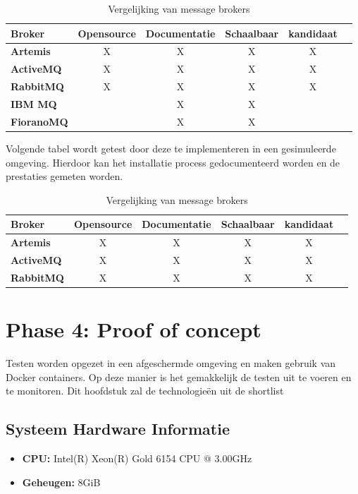 \begin{table}[h!]
  \centering
  \footnotesize
\begin{tabular}{|l|c|c|c|c|c|}
  \hline
  \textbf{Broker} & \textbf{Opensource} & \textbf{Documentatie} & \textbf{Schaalbaar} & \textbf{kandidaat}\\ \hline
  \textbf{Artemis}   & X & X & X & X \\ \hline
  \textbf{ActiveMQ}  & X & X & X & X \\ \hline
  \textbf{RabbitMQ}  & X & X & X & X \\ \hline  
  \textbf{IBM MQ}    &   & X & X &  \\ \hline 
  \textbf{FioranoMQ} &   & X & X &  \\ \hline 
\end{tabular}
\caption{Vergelijking van message brokers}
\label{tab:vergelijking_message_brokers_should_have}
\end{table}

Volgende tabel wordt getest door deze te implementeren in een gesimuleerde omgeving.
Hierdoor kan het installatie process gedocumenteerd worden en de prestaties gemeten worden.  

\begin{table}[h!]
  \centering
  \footnotesize
\begin{tabular}{|l|c|c|c|c|c|}
  \hline
  \textbf{Broker} & \textbf{Opensource} & \textbf{Documentatie} & \textbf{Schaalbaar} & \textbf{kandidaat}\\ \hline
  \textbf{Artemis}   & X & X & X & X \\ \hline
  \textbf{ActiveMQ}  & X & X & X & X \\ \hline
  \textbf{RabbitMQ}  & X & X & X & X \\ \hline   
\end{tabular}
\caption{Vergelijking van message brokers}
\label{tab:vergelijking_message_brokers_candidates_poc}
\end{table}
    
\section{Phase 4: Proof of concept}
Testen worden opgezet in een afgeschermde omgeving en maken gebruik van Docker containers.
Op deze manier is het gemakkelijk de testen uit te voeren en te monitoren.
Dit hoofdstuk zal de technologieën uit de shortlist 

\subsection{Systeem Hardware Informatie}  
\begin{itemize}
    \item \textbf{CPU:} Intel(R) Xeon(R) Gold 6154 CPU @ 3.00GHz
    \item \textbf{Geheugen:} 8GiB
\end{itemize}

